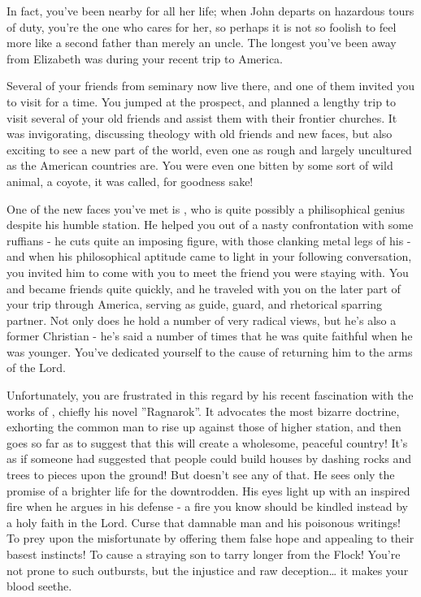 \documentclass[char]{airship}
\begin{document}
In fact, you've been nearby for all her life; when John departs on
hazardous tours of duty, you're the one who cares for her, so
perhaps it is not so foolish to feel more like a second father than
merely an uncle. The longest you've been away from Elizabeth was
during your recent trip to America.

Several of your friends from seminary now live there, and one of them
invited you to visit for a time. You jumped at the prospect, and
planned a lengthy trip to visit several of your old friends and assist
them with their frontier churches. It was invigorating, discussing
theology with old friends and new faces, but also exciting to see a
new part of the world, even one as rough and largely uncultured as the
American countries are. You were even one bitten by some sort of wild
animal, a coyote, it was called, for goodness sake!

One of the new faces you've met is \cCowboy{\intro}, who is quite
possibly a philisophical genius despite his humble station. He helped
you out of a nasty confrontation with some ruffians - he cuts quite an
imposing figure, with those clanking metal legs of his - and when his
philosophical aptitude came to light in your following conversation,
you invited him to come with you to meet the friend you were staying
with. You and \cCowboy{} became friends quite quickly, and he traveled
with you on the later part of your trip through America, serving as
guide, guard, and rhetorical sparring partner. Not only does he hold a
number of very radical views, but he's also a former Christian - he's
said a number of times that he was quite faithful when he was
younger. You've dedicated yourself to the cause of returning him to
the arms of the Lord.

Unfortunately, you are frustrated in this regard by his recent
fascination with the works of \cSaboteur{\intro}, chiefly his novel
''Ragnarok''. It advocates the most bizarre doctrine, exhorting the
common man to rise up against those of higher station, and then goes
so far as to suggest that this will create a wholesome, peaceful
country! It's as if someone had suggested that people could build
houses by dashing rocks and trees to pieces upon the ground! But
\cCowboy{} doesn't see any of that. He sees only the promise of a
brighter life for the downtrodden. His eyes light up with an inspired
fire when he argues in his defense - a fire you know should be kindled
instead by a holy faith in the Lord. Curse that damnable man and his
poisonous writings! To prey upon the misfortunate by offering them
false hope and appealing to their basest instincts! To cause a
straying son to tarry longer from the Flock! You're not prone to such
outbursts, but the injustice and raw deception{\ldots} it makes your
blood seethe.
\end{document}
